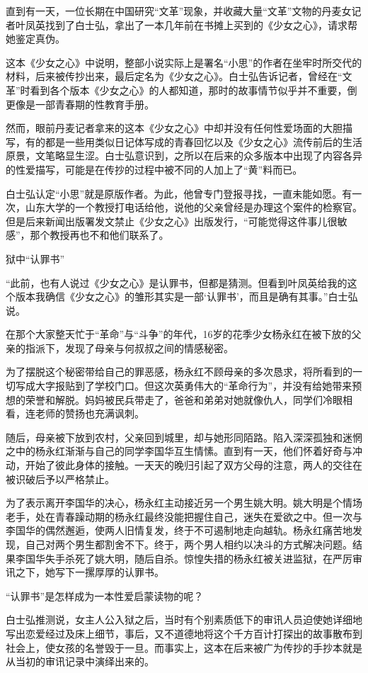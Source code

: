 \documentclass[12pt,UTF8]{ctexbook}
\begin{document}
直到有一天，一位长期在中国研究“文革”现象，并收藏大量“文革”文物的丹麦女记者叶凤英找到了白士弘，拿出了一本几年前在书摊上买到的《少女之心》，请求帮她鉴定真伪。

这本《少女之心》中说明，整部小说实际上是署名“小思”的作者在坐牢时所交代的材料，后来被传抄出来，最后定名为《少女之心》。白士弘告诉记者，曾经在“文革”时看到各个版本《少女之心》的人都知道，那时的故事情节似乎并不重要，倒更像是一部青春期的性教育手册。

然而，眼前丹麦记者拿来的这本《少女之心》中却并没有任何性爱场面的大胆描写，有的都是一些用类似日记体写成的青春回忆以及《少女之心》流传前后的生活原景，文笔略显生涩。白士弘意识到，之所以在后来的众多版本中出现了内容各异的性爱描写，可能是在传抄的过程中被不同的人加上了“黄”料而已。

白士弘认定“小思”就是原版作者。为此，他曾专门登报寻找，一直未能如愿。有一次，山东大学的一个教授打电话给他，说他的父亲曾经是办理这个案件的检察官。但是后来新闻出版署发文禁止《少女之心》出版发行，“可能觉得这件事儿很敏感”，那个教授再也不和他们联系了。

狱中“认罪书”

“此前，也有人说过《少女之心》是认罪书，但都是猜测。但看到叶凤英给我的这个版本我确信《少女之心》的雏形其实是一部‘认罪书’，而且是确有其事。”白士弘说。

在那个大家整天忙于“革命”与“斗争”的年代，16岁的花季少女杨永红在被下放的父亲的指派下，发现了母亲与何叔叔之间的情感秘密。

为了摆脱这个秘密带给自己的罪恶感，杨永红不顾母亲的多次恳求，将所看到的一切写成大字报贴到了学校门口。但这次英勇伟大的“革命行为”，并没有给她带来预想的荣誉和解脱。妈妈被民兵带走了，爸爸和弟弟对她就像仇人，同学们冷眼相看，连老师的赞扬也充满讽刺。

随后，母亲被下放到农村，父亲回到城里，却与她形同陌路。陷入深深孤独和迷惘之中的杨永红渐渐与自己的同学李国华互生情愫。直到有一天，他们怀着好奇与冲动，开始了彼此身体的接触。一天天的晚归引起了双方父母的注意，两人的交往在被识破后予以严格禁止。

为了表示离开李国华的决心，杨永红主动接近另一个男生姚大明。姚大明是个情场老手，处在青春躁动期的杨永红最终没能把握住自己，迷失在爱欲之中。但一次与李国华的偶然邂逅，使两人旧情复发，终于不可遏制地走向越轨。杨永红痛苦地发现，自己对两个男生都割舍不下。终于，两个男人相约以决斗的方式解决问题。结果李国华失手杀死了姚大明，随后自杀。惊惶失措的杨永红被关进监狱，在严厉审讯之下，她写下一摞厚厚的认罪书。

“认罪书”是怎样成为一本性爱启蒙读物的呢？

白士弘推测说，女主人公入狱之后，当时有个别素质低下的审讯人员迫使她详细地写出恋爱经过及床上细节，事后，又不道德地将这个千方百计打探出的故事散布到社会上，使女孩的名誉毁于一旦。而事实上，这本在后来被广为传抄的手抄本就是从当初的审讯记录中演绎出来的。
\end{document}
